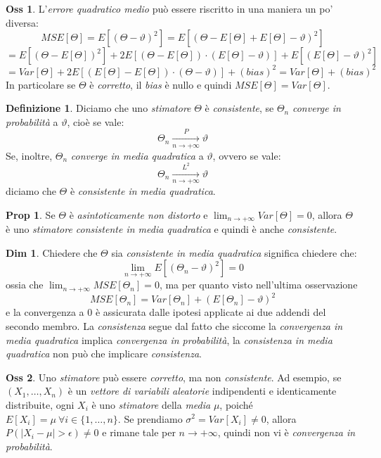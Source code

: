 \documentclass[12pt, a4paper]{report}
\theoremstyle{definition}
\newtheorem{definition}{Definizione}[section]
\newtheorem*{demonstration}{Dim}
\newtheorem*{proposition}{Prop}
\newtheorem*{observation}{Oss}
\newcommand\conv[2]{\xrightarrow[#2\to +\infty]{#1}}
\begin{document}
\begin{observation}
	L'\emph{errore quadratico medio} può essere riscritto in una maniera un po'
	diversa:
	\[MSE[\Theta]=E\left[(\Theta-\vartheta)^2\right]=E\left[(\Theta-E[\Theta]+
	E[\Theta]-\vartheta)^2\right]\]
	\[=E\left[(\Theta-E[\Theta])^2\right]+2E\left[(\Theta-E[\Theta])\cdot (E[\Theta]-
	\vartheta)\right]+E[(E[\Theta]-\vartheta)^2]\]
	\[=Var[\Theta]+2E\left[(E[\Theta]-E[\Theta])\cdot (\Theta-\vartheta)\right]+(bias)
	^2=Var[\Theta]+(bias)^2\]
	In particolare se $\Theta$ è \emph{corretto}, il \emph{bias} è nullo e quindi
	\(MSE[\Theta]=Var[\Theta]\).
\end{observation}

\begin{definition}
	Diciamo che uno \emph{stimatore} $\Theta$ è \emph{consistente}, se $\Theta_n$
	\emph{converge in probabilità} a $\vartheta$, cioè se vale:
	\[\Theta_n\conv{P}{n}\vartheta\]
	Se, inoltre, $\Theta_n$ \emph{converge in media quadratica} a $\vartheta$,
	ovvero se vale:
	\[\Theta_n\conv{L^2}{n}\vartheta\]
	diciamo che $\Theta$ è \emph{consistente in media quadratica}.
\end{definition}

\begin{proposition}
	Se $\Theta$ è \emph{asintoticamente non distorto} e \(\lim_{n\to+\infty}Var
	[\Theta]=0\), allora $\Theta$ è uno \emph{stimatore consistente in media
	quadratica} e quindi è anche \emph{consistente}.
\end{proposition}

\begin{demonstration}
	Chiedere che $\Theta$ sia \emph{consistente in media quadratica} significa
	chiedere che:
	\[\lim_{n\to+\infty}E\left[(\Theta_n-\vartheta)^2\right]=0\]
	ossia che \(\lim_{n\to+\infty}MSE[\Theta_n]=0\), ma per quanto visto nell'ultima
	osservazione
	\[MSE[\Theta_n]=Var[\Theta_n]+(E[\Theta_n]-\vartheta)^2\]
	e la convergenza a $0$ è assicurata dalle ipotesi applicate ai due addendi
	del secondo membro. La \emph{consistenza} segue dal fatto che siccome la
	\emph{convergenza in media quadratica} implica \emph{convergenza in probabilità},
	la \emph{consistenza in media quadratica} non può che implicare \emph{consistenza}.
\end{demonstration}

\begin{observation}
	Uno \emph{stimatore} può essere \emph{corretto}, ma non \emph{consistente}.
	Ad esempio, se \((X_1,\dots,X_n)\) è un \emph{vettore di variabili aleatorie}
	indipendenti e identicamente distribuite, ogni $X_i$ è uno \emph{stimatore}
	della \emph{media} $\mu$, poiché \(E[X_i]=\mu\ \forall i\in\{1,\dots,n\}\).
	Se prendiamo \(\sigma^2=Var[X_i]\neq 0\), allora \(P(|X_i-\mu|>\epsilon)\neq0\)
	e rimane tale per \(n\to+\infty\), quindi non vi è \emph{convergenza in
	probabilità}.
\end{observation}
\end{document}

